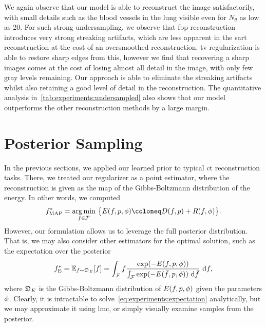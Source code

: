 \documentclass[../ml-ct.tex]{subfiles}
\begin{document}
We again observe that our model is able to reconstruct the image satisfactorily, with small details such as the blood vessels in the lung visible even for \( N_\theta \) as low as \num{20}.
For such strong undersampling, we observe that \gls{fbp} reconstruction introduces very strong streaking artifacts, which are less apparent in the \gls{sart} reconstruction at the cost of an oversmoothed reconstruction.
\gls{tv} regularization is able to restore sharp edges from this, however we find that recovering a sharp images comes at the cost of losing almost all detail in the image, with only few gray levels remaining.
Our approach is able to eliminate the streaking artifacts whilst also retaining a good level of detail in the reconstruction.
The quantitative analysis in~\cref{tab:experiments:undersampled} also shows that our model outperforms the other reconstruction methods by a large margin.
\section{Posterior Sampling}%
\label{sec:experiments:posterior-sampling}
In the previous sections, we applied our learned prior to typical \gls{ct} reconstruction tasks.
There, we treated our regularizer as a point estimator, where the reconstruction is given as the \gls{map} of the Gibbs-Boltzmann distribution of the energy.
In other words, we computed
\begin{equation}
	\optimal{f}{MAP} = \argmin_{f \in \set{F}}\ \bigl\{ E(f, p, \params) \coloneq D(f, p) + R(f, \params) \bigr\}.
\end{equation}
However, our formulation allows us to leverage the full posterior distribution.
That is, we may also consider other estimators for the optimal solution, such as the expectation over the posterior
\begin{equation}
	\optimal{f}{E} = \mathbb{E}_{f \sim \distr{E}} [f] = \int_{\mathcal{F}} f \frac{\exp(-E(f, p, \params))}{\int_{\mathcal{F}} \exp(-E(\bar{f}, p, \params))\ \mathrm{d} \bar{f}}\ \mathrm{d}f,%
	\label{eq:experiments:expectation}
\end{equation}
where \( \mathfrak{D}_{E} \) is the Gibbs-Boltzmann distribution of \( E(f, p, \phi) \) given the parameters \( \phi \).
Clearly, it is intractable to solve~\cref{eq:experiments:expectation} analytically, but we may approximate it using \gls{lmc}, or simply visually examine samples from the posterior.
\end{document}
